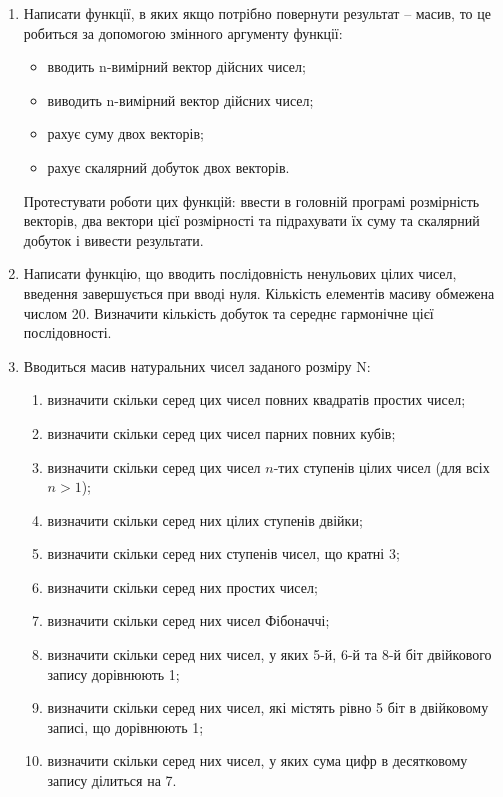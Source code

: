 \documentclass[]{article}
\makeatletter
\newcommand{\xslalph}[1]{\expandafter\@xslalph\csname c@#1\endcsname}
\newcommand{\@xslalph}[1]{%
    \ifcase#1\or а\or б\or в\or г\or д\or e\or є\or ж\or з\or i%
    \or й\or к\or л\or м\or н\or о\or п\or р\or с\or т%
    \or у\or ф\or х\or ц\or ч\or ш\or ю\or я\or аа\or бб\or вв %
    \else\@ctrerr\fi%
}
\makeatother
\begin{document}
\begin{enumerate}
\item
Написати функції, в яких якщо потрібно повернути результат -- масив,
то це робиться за допомогою змінного аргументу функції:
\begin{itemize}
\item вводить n-вимірний вектор дійсних чисел;
\item виводить n-вимірний вектор дійсних чисел;
\item рахує суму двох векторів;
\item рахує скалярний добуток двох векторів.
 \end{itemize}
Протестувати роботи цих функцій: ввести в головній програмі розмірність
векторів, два вектори цієї розмірності та підрахувати їх суму та скалярний
добуток і вивести результати.
\item
  Написати функцію, що вводить послідовність ненульових цілих чисел,
  введення завершується при вводі нуля. Кількість елементів масиву
  обмежена числом 20. Визначити кількість добуток та середнє гармонічне
  цієї послідовності.
\item
  Вводиться масив натуральних чисел заданого розміру N:
\begin{enumerate}[label=\xslalph*)]
\item визначити скільки серед цих чисел повних квадратів простих чисел;
\item визначити скільки серед цих чисел парних повних кубів;
\item визначити скільки серед цих чисел $n$-тих ступенів цілих чисел (для
всіх $n>1$);
\item визначити скільки серед них цілих ступенів двійки;
\item визначити скільки серед них ступенів чисел, що кратні 3;
\item визначити скільки серед них простих чисел;
\item визначити скільки серед них чисел Фібоначчі;
\item визначити скільки серед них чисел, у яких 5-й, 6-й та 8-й біт
двійкового запису дорівнюють 1;
\item визначити скільки серед них чисел, які містять рівно 5 біт в
двійковому записі, що дорівнюють 1;
\item визначити скільки серед них чисел, у яких сума цифр в десятковому
запису ділиться на 7.
 \end{enumerate}


\end{enumerate}
\end{document}
